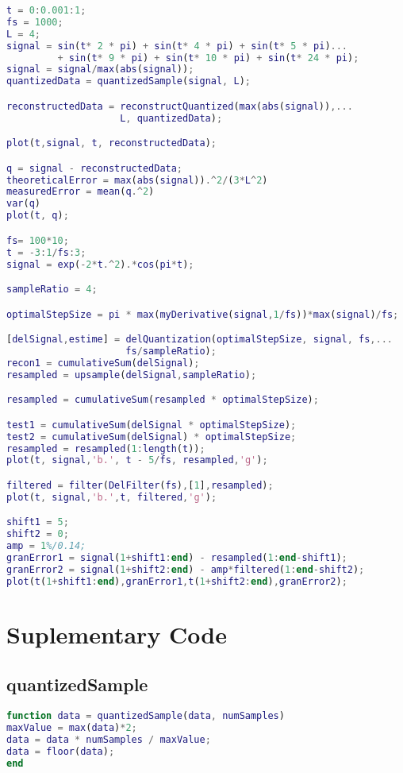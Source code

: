 \documentclass{article}
\begin{document}
\begin{lstlisting}[language = MATLAB]
t = 0:0.001:1;
fs = 1000;
L = 4;
signal = sin(t* 2 * pi) + sin(t* 4 * pi) + sin(t* 5 * pi)...
         + sin(t* 9 * pi) + sin(t* 10 * pi) + sin(t* 24 * pi);
signal = signal/max(abs(signal));
quantizedData = quantizedSample(signal, L);

reconstructedData = reconstructQuantized(max(abs(signal)),...
                    L, quantizedData);

plot(t,signal, t, reconstructedData);

q = signal - reconstructedData;
theoreticalError = max(abs(signal)).^2/(3*L^2)
measuredError = mean(q.^2)
var(q)
plot(t, q);

fs= 100*10;
t = -3:1/fs:3;
signal = exp(-2*t.^2).*cos(pi*t);

sampleRatio = 4;

optimalStepSize = pi * max(myDerivative(signal,1/fs))*max(signal)/fs;

[delSignal,estime] = delQuantization(optimalStepSize, signal, fs,...
                     fs/sampleRatio);
recon1 = cumulativeSum(delSignal);
resampled = upsample(delSignal,sampleRatio);

resampled = cumulativeSum(resampled * optimalStepSize);

test1 = cumulativeSum(delSignal * optimalStepSize);
test2 = cumulativeSum(delSignal) * optimalStepSize;
resampled = resampled(1:length(t));
plot(t, signal,'b.', t - 5/fs, resampled,'g');

filtered = filter(DelFilter(fs),[1],resampled);
plot(t, signal,'b.',t, filtered,'g');

shift1 = 5;
shift2 = 0;
amp = 1%/0.14;
granError1 = signal(1+shift1:end) - resampled(1:end-shift1);
granError2 = signal(1+shift2:end) - amp*filtered(1:end-shift2);
plot(t(1+shift1:end),granError1,t(1+shift2:end),granError2);
\end{lstlisting}

\section{Suplementary Code}
\subsection{quantizedSample}
\begin{lstlisting}[language = MATLAB]
function data = quantizedSample(data, numSamples)
maxValue = max(data)*2;
data = data * numSamples / maxValue;
data = floor(data);
end
\end{lstlisting}
\end{document}
